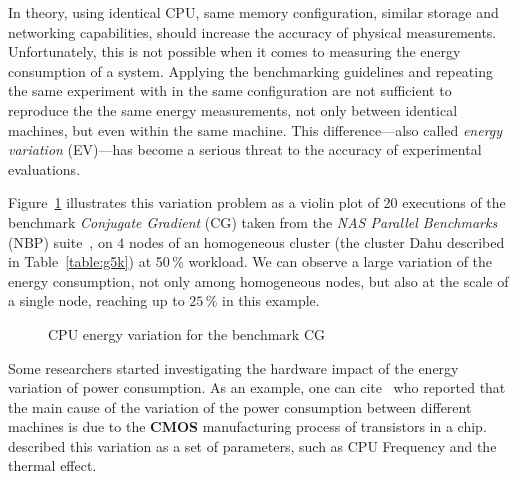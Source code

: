 In theory, using identical CPU, same memory configuration, similar storage and networking capabilities, should increase the accuracy of physical measurements.
Unfortunately, this is not possible when it comes to measuring the energy consumption of a system.
Applying the benchmarking guidelines and repeating the same experiment with in the same configuration are not sufficient to reproduce the the same energy measurements, not only between identical machines, but even within the same machine.
This difference---also called \emph{energy variation} (EV)---has become a serious threat to the accuracy of experimental evaluations.

Figure~\ref{fig:motivation} illustrates this variation problem as a violin plot of $20$ executions of the benchmark \emph{Conjugate Gradient} (\textsf{CG}) taken from the \emph{NAS Parallel Benchmarks} (NBP) suite~\cite{Bailey:1991:NPB:125826.125925}, on $4$ nodes of an homogeneous cluster (the cluster \textsf{Dahu} described in Table~\ref{table:g5k}) at 50\,\% workload.
We can observe a large variation of the energy consumption, not only among homogeneous nodes, but also at the scale of a single node, reaching up to $25\,\%$ in this example.

\begin{figure}%
    \caption{CPU energy variation for the benchmark \textsf{CG}}\label{fig:motivation}
\end{figure}
Some researchers started investigating the hardware impact of the energy variation of power consumption.
As an example, one can cite~\cite{borkar_designing_2005,tschanz_adaptive_2002} who reported that the main cause of the variation of the power consumption between different machines is due to the \textbf{CMOS} manufacturing process of transistors in a chip.
\cite{heinrich_predicting} described this variation as a set of parameters, such as CPU Frequency and the thermal effect.



